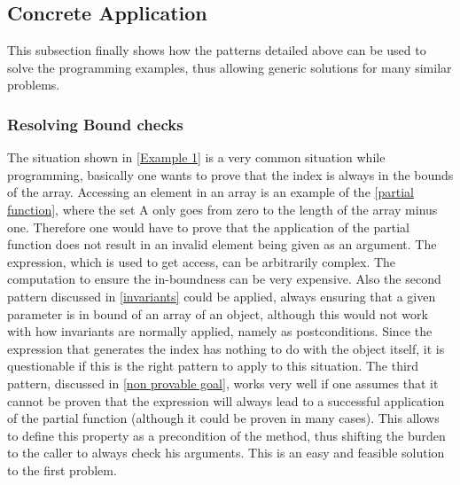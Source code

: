 \subsection{Concrete Application}
This subsection finally shows how the patterns detailed above can be used to solve the programming examples, thus allowing generic solutions for many similar problems.
\subsubsection{Resolving Bound checks}
The situation shown in \ref{Example 1} is a very common situation while programming, basically one wants to prove that the index is always in the bounds of the array. Accessing an element in an array is an example of the \ref{partial function}, where the set A only goes from zero to the length of the array minus one. Therefore one would have to prove that the application of the partial function does not result in an invalid element being given as an argument. The expression, which is used to get access, can be arbitrarily complex. The computation to ensure the in-boundness can be very expensive.  \newline
Also the second pattern discussed in \ref{invariants} could be applied, always ensuring that a given parameter is in bound of an array of an object, although this would not work with how invariants are normally applied, namely as postconditions. Since the expression that generates the index has nothing to do with the object itself, it is questionable if this is the right pattern to apply to this situation. \newline
The third pattern, discussed in \ref{non provable goal}, works very well if one assumes that it cannot be proven that the expression will always lead to a successful application of the partial function (although it could be proven in many cases). This allows to define this property as a precondition of the method, thus shifting the burden to the caller to always check his arguments. This is an easy and feasible solution to the first problem. 
